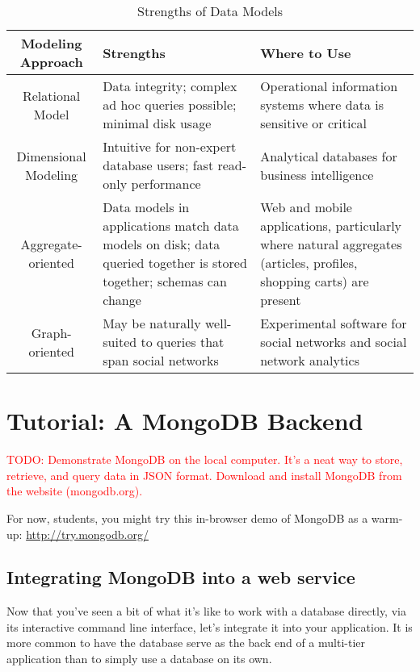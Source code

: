 \documentclass[11pt]{book}
\newcommand{\head}[1]{\textnormal{\textbf{#1}}} %
\newcommand{\todo}[1]{\textcolor{red}{TODO: #1}} %
\begin{document}
\begin{table}
\centering
\caption{Strengths of Data Models}
\vspace{10pt}
\begin{tabular}{cp{4cm}p{4cm}}
    \toprule[1.5pt]
    \head{Modeling Approach} & \head{Strengths} & \head{Where to Use} \\
    \midrule
    Relational Model & Data integrity; complex ad hoc queries possible; minimal disk usage & Operational information systems where data is sensitive or critical\\
    \midrule
    Dimensional Modeling & Intuitive for non-expert database users; fast read-only performance & Analytical databases for business intelligence\\
    \midrule
    Aggregate-oriented & Data models in applications match data models on disk; data queried together is stored together; schemas can change & Web and mobile applications, particularly where natural aggregates (articles, profiles, shopping carts) are present \\
    \midrule
    Graph-oriented & May be naturally well-suited to queries that span social networks & Experimental software for social networks and social network analytics \\
    \bottomrule[1.5pt]
\end{tabular}
\end{table}



\section{Tutorial: A MongoDB Backend}

\todo{Demonstrate MongoDB on the local computer.  It's a neat way to store, retrieve, and query data in JSON format.  Download and install MongoDB from the website (mongodb.org).}

For now, students, you might try this in-browser demo of MongoDB as a warm-up: \url{http://try.mongodb.org/}

\subsection*{Integrating MongoDB into a web service}

Now that you've seen a bit of what it's like to work with a database directly, via its interactive command line interface, let's integrate it into your application.  It is more common to have the database serve as the back end of a multi-tier application than to simply use a database on its own.
\end{document}
